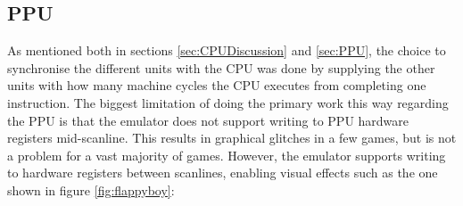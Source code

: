 \subsection{PPU}
As mentioned both in sections \ref{sec:CPUDiscussion} and \ref{sec:PPU}, the choice to synchronise the different units with the CPU was done by supplying the other units with how many machine cycles the CPU executes from completing one instruction. The biggest limitation of doing the primary work this way regarding the PPU is that the emulator does not support writing to PPU hardware registers mid-scanline. This results in graphical glitches in a few games, but is not a problem for a vast majority of games. However, the emulator supports writing to hardware registers between scanlines, enabling visual effects such as the one shown in figure \ref{fig:flappyboy}:


